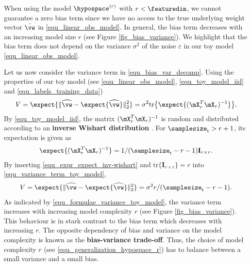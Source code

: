 \documentclass[12pt]{report}
\begin{document}
When using the model $\hypospace^{(r)}$ with $r < \featuredim$, we cannot guarantee 
a zero bias term since we have no access to the true underlying weight vector $\bar{\vw}$ 
in \eqref{equ_linear_obs_model}. In general, the bias term decreases with an 
increasing model size $r$ (see Figure \ref{fig_bias_variance}). We 
highlight that the bias term does not depend on the variance 
$\sigma^{2}$ of the noise $\varepsilon$ in our toy model \eqref{equ_linear_obs_model}. 

Let us now consider the variance term in \eqref{equ_bias_var_decomp}. 
Using the properties of our toy model (see \eqref{equ_linear_obs_model}, 
\eqref{equ_toy_model_iid} and \eqref{equ_labels_training_data})
\begin{equation}
\label{equ_variance_term_toy_model}
V = \expect \{ \| \widehat{\vw} - \expect\{ \widehat{\vw} \} \|^{2}_{2} \} = \sigma^{2} \mbox{tr} \big\{ \expect\{(\mX_{r}^{T} \mX_{r})^{-1} \} \big\}.
\end{equation} 
By \eqref{equ_toy_model_iid}, the matrix $(\mX_{r}^{T} \mX_{r})^{-1}$ is 
random and distributed according to an {\bf inverse Wishart distribution} \cite{Mardia1979}. 
For $\samplesize_{\rm t} > r +1$, its expectation is given as 
\begin{equation} 
\label{equ_expr_expect_inv-wishart}
\expect\{(\mX_{r}^{T} \mX_{r})^{-1} \} = 1/(\samplesize_{\rm t}-r-1) \mathbf{I}_{r \times r}.
\end{equation} 
By inserting \eqref{equ_expr_expect_inv-wishart} and $\mbox{tr} \{ \mathbf{I}_{r \times r} \} = r$ into \eqref{equ_variance_term_toy_model}, 
\begin{equation} 
\label{equ_formulae_variance_toy_model}
V= \expect \{ \| \widehat{\vw} - \expect\{ \widehat{\vw} \} \|^{2}_{2} \} = \sigma^{2} r/(\samplesize_{\rm t}-r-1). 
\end{equation} 
As indicated by \eqref{equ_formulae_variance_toy_model}, the 
variance term increases with increasing model complexity $r$ 
(see Figure \ref{fig_bias_variance}). This behaviour is in stark 
contrast to the bias term which decreases with increasing $r$. 
The opposite dependency of bias and variance on the model 
complexity is known as the {\bf bias-variance trade-off}. Thus, 
the choice of model complexity $r$ (see \eqref{equ_generalization_hypospace_r}) 
has to balance between a small variance and a small bias. 
\end{document}
